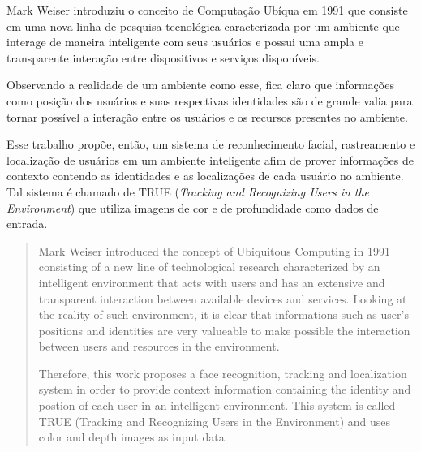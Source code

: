 \begin{resumo}

	Mark Weiser introduziu o conceito de Computação Ubíqua em 1991 que consiste em uma nova linha de pesquisa tecnológica caracterizada por um ambiente que interage de maneira inteligente com seus usuários e possui uma ampla e transparente interação entre dispositivos e serviços disponíveis. 

% 

	Observando a realidade de um ambiente como esse, fica claro que informações como posição dos usuários e suas respectivas identidades são de grande valia para tornar possível a interação entre os usuários e os recursos presentes no ambiente.



	Esse trabalho propõe, então, um sistema de reconhecimento facial, rastreamento e localização de usuários em um ambiente inteligente afim de prover informações de contexto contendo as identidades e as localizações de cada usuário no ambiente. Tal sistema é chamado de TRUE (\textit{Tracking and Recognizing Users in the Environment}) que utiliza imagens de cor e de profundidade como dados de entrada.

\end{resumo}


\begin{abstract}
	
	Mark Weiser introduced the concept of Ubiquitous Computing in 1991 consisting of a new line of technological research characterized by an intelligent environment that acts with users and has an extensive and transparent interaction between available devices and services. Looking at the reality of such environment, it is clear that informations such as user's positions and identities are very valueable to make possible the interaction between users and resources in the environment.

	Therefore, this work proposes a face recognition, tracking and localization system in order to provide context information containing the identity and postion of each user in an intelligent environment. This system is called TRUE (Tracking and Recognizing Users in the Environment) and uses color and depth images as input data.

\end{abstract}

